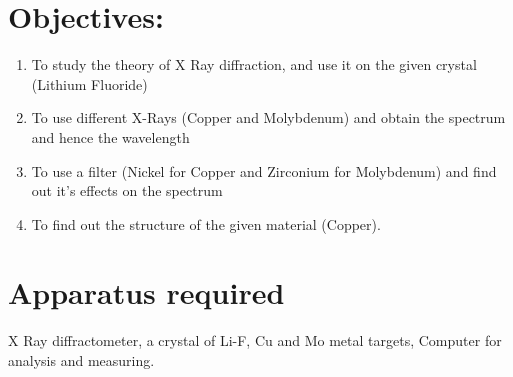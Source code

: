 \documentclass[]{report}[12 pt]
\begin{document}
	
	\section*{Objectives:}
	\begin{enumerate}
	\item To study the theory of X Ray diffraction, and use it on the given crystal (Lithium Fluoride)
	\item To use different X-Rays (Copper and Molybdenum) and obtain the spectrum and hence the wavelength
	\item To use a filter (Nickel for Copper and Zirconium for Molybdenum) and find out it's effects on the spectrum
	\item To find out the structure of the given material (Copper).
	\end{enumerate}
	\section*{Apparatus required}
	X Ray diffractometer, a crystal of Li-F, Cu and Mo metal targets, Computer for analysis and measuring.
\end{document}
